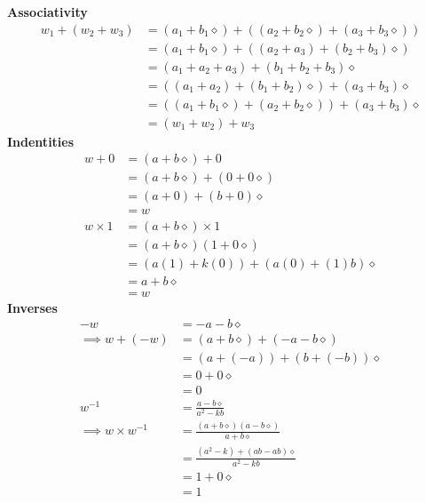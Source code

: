 \documentclass[addpoints]{exam}
\theoremstyle{mytheoremstyle}
\theoremstyle{mytheoremstyle}
\theoremstyle{myproblemstyle}
\begin{document}
\begin{questions}
\begin{parts}
\begin{solution}
			\textbf{Associativity}
			\begin{align*}
				w_{1}+(w_{2}+w_{3}) & = (a_{1}+b_{1}\diamond)+((a_{2}+b_{2}\diamond)+(a_{3}+b_{3}\diamond)) \\
				                    & = (a_{1}+b_{1}\diamond)+((a_{2}+a_{3})+(b_{2}+b_{3})\diamond)         \\
				                    & = (a_{1}+a_{2}+a_{3})+(b_{1}+b_{2}+b_{3})\diamond                     \\
				                    & = ((a_{1}+a_{2})+(b_{1}+b_{2})\diamond)+(a_{3}+b_{3})\diamond         \\
				                    & = ((a_{1}+b_{1}\diamond)+(a_{2}+b_{2}\diamond))+(a_{3}+b_{3})\diamond \\
				                    & = (w_{1}+w_{2})+w_{3}
			\end{align*}
			\textbf{Indentities}
			\begin{align*}
				w+0       & = (a+b\diamond)+0                 \\
				          & = (a+b\diamond)+(0+0\diamond)     \\
				          & = (a+0)+(b+0)\diamond             \\
				          & = w                               \\
				w\times 1 & = (a+b\diamond)\times 1           \\
				          & = (a+b\diamond)(1+0\diamond)      \\
				          & = (a(1)+k(0))+(a(0)+(1)b)\diamond \\
				          & = a+b\diamond                     \\
				          & = w
			\end{align*}
			\textbf{Inverses}
			\begin{align*}
				-w                      & = -a-b\diamond                                     \\
				\implies w+(-w)         & = (a+b\diamond)+(-a-b\diamond)                     \\
				                        & = (a+(-a))+(b+(-b))\diamond                        \\
				                        & = 0+0\diamond                                      \\
				                        & = 0                                                \\
				w^{-1}                  & = \frac{a-b\diamond}{a^{2}-kb}                     \\
				\implies w\times w^{-1} & = \frac{(a+b\diamond)(a-b\diamond)}{a + b\diamond} \\
				                        & = \frac{(a^{2}-k)+(ab-ab)\diamond}{a^{2}-kb}       \\
				                        & = 1+0\diamond                                      \\
				                        & = 1
			\end{align*}
		\end{solution}
	\end{parts}


\end{questions}
\end{document}
